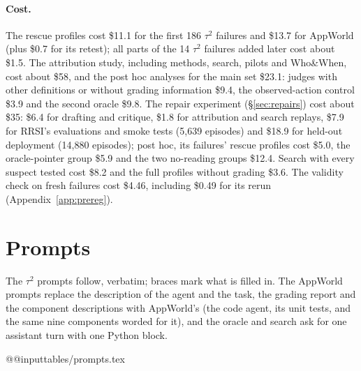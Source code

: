 \documentclass[11pt]{article}
\begin{document}
\paragraph{Cost.} The rescue profiles cost \$11.1 for the first 186 $\tau^2$ failures and \$13.7 for AppWorld (plus \$0.7 for its retest); all parts of the 14 $\tau^2$ failures added later cost about \$1.5. The attribution study, including methods, search, pilots and Who\&When, cost about \$58, and the post hoc analyses for the main set \$23.1: judges with other definitions or without grading information \$9.4, the observed-action control \$3.9 and the second oracle \$9.8. The repair experiment (\S\ref{sec:repairs}) cost about \$35: \$6.4 for drafting and critique, \$1.8 for attribution and search replays, \$7.9 for RRSI's evaluations and smoke tests (5{,}639 episodes) and \$18.9 for held-out deployment (14{,}880 episodes); post hoc, its failures' rescue profiles cost \$5.0, the oracle-pointer group \$5.9 and the two no-reading groups \$12.4. Search with every suspect tested cost \$8.2 and the full profiles without grading \$3.6. The validity check on fresh failures cost \$4.46, including \$0.49 for its rerun (Appendix~\ref{app:prereg}).

\section{Prompts}
\label{app:prompts}
The $\tau^2$ prompts follow, verbatim; braces mark what is filled in. The AppWorld prompts replace the description of the agent and the task, the grading report and the component descriptions with AppWorld's (the code agent, its unit tests, and the same nine components worded for it), and the oracle and search ask for one assistant turn with one Python block.

\csname @@input\endcsname tables/prompts.tex
\end{document}
